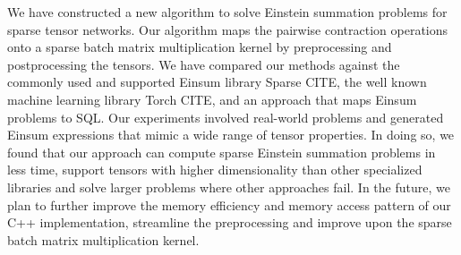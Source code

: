 We have constructed a new algorithm to solve Einstein summation problems for sparse tensor networks.
Our algorithm maps the pairwise contraction operations onto a sparse batch matrix multiplication kernel
by preprocessing and postprocessing the tensors. We have compared our methods against the commonly used
and supported Einsum library Sparse CITE, the well known machine learning library Torch CITE, and an
approach that maps Einsum problems to SQL. Our experiments involved real-world problems and generated
Einsum expressions that mimic a wide range of tensor properties. In doing so, we found that our approach
can compute sparse Einstein summation problems in less time, support tensors with higher dimensionality
than other specialized libraries and solve larger problems where other approaches fail. In the future,
we plan to further improve the memory efficiency and memory access pattern of our C++ implementation,
streamline the preprocessing and improve upon the sparse batch matrix multiplication kernel.